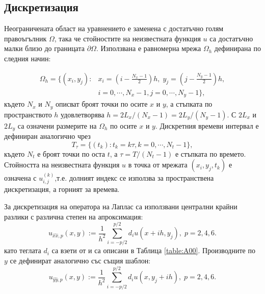 \documentclass[a4paper]{article}
\newcommand{\be}{\begin{equation}}
\newcommand{\ee}{\end{equation}}
\theoremstyle{remark}
\begin{document}
\begin{large}
\subsection{Дискретизация}\label{discretization}
Неограничената област на уравнението е заменена с достатъчно голям правоъгълник $\Omega$, така че стойностите на неизвестната функция $u$ са достатъчно малки близо до границата $\partial \Omega$. Използвана е равномерна мрежа  $\Omega_h$ дефинирана по следния начин:

\begin{align}\label{Omega}
\Omega_h = \{(x_i,y_j):& x_i = (i-\frac{N_x-1}{2})h, \; y_j = (j-\frac{N_y-1}{2})h, \nonumber\\
                                   & i = 0,\cdots, N_x-1, j = 0 ,\cdots , N_y-1 \},
\end{align}
където $N_x$ и $N_y$ описват броят точки по осите $x$ и $y$, а стъпката по пространството $h$ удовлетворява $h =2 L_x/(N_x-1) =2 L_y/(N_y-1)$.
С $2 L_x$ и $2 L_y$ са означени размерите на $\Omega_h$ по осите $x$ и $y$. Дискретния времеви интервал е дефиниран аналогично чрез
\be
T_{\tau} = \{(t_k): t_k = k\tau, k = 0,\cdots ,N_t-1 \},
\ee
където $N_t$ е броят точки по оста $t$, а $\tau = T/(N_t-1)$ е стъпката по времето. Стойността на неизвестната функция $u$ в точка от мрежата $(x_i,y_j,t_k)$ е означена с $u_{i,j}^{(k)}$,т.е. долният индекс се използва за пространствена дискретизация, а горният за времева. 

За дискретизация на оператора на Лаплас са използвани централни крайни разлики с различна степен на апроксимация:
\begin{equation}\label{fdx}
u_{\widehat{xx},p}(x,y) :=  \frac{1}{h^2} \sum\limits_{i=-p/2}^{p/2} d_i u(x+ih, y_j), \; p=2,4,6.
\end{equation}
като теглата $d_i$ са взети от \cite{forn} и са описани в Таблица \ref{table:A00}. Производните по $y$ се дефинират аналогично със същия шаблон:
\begin{equation}\label{fdy}
u_{\widehat{yy},p}(x,y) :=  \frac{1}{h^2} \sum\limits_{i=-p/2}^{p/2} d_i u(x, y_j+ih), \; p=2,4,6.
\end{equation}


\end{large}
\end{document}
